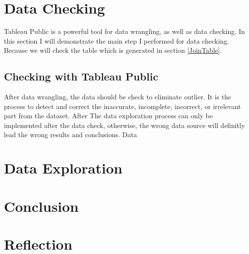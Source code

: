 \documentclass[11pt]{article}
\theoremstyle{definition}
\begin{document}
\section{Data Checking}
Tableau Public is a powerful tool for data wrangling, as well as data checking. In this section I will demonstrate the main step I performed for data checking. Because we will check the table which is generated in section \ref{JoinTable}. 
\label{dataChecking}
\subsection{Checking with Tableau Public}
After data wrangling, the data should be check to eliminate outlier. It is the process to detect and correct the inaccurate, incomplete, incorrect, or irrelevant part from the dataset. After 
The data exploration process can only be implemented after the data check, otherwise, the wrong data source will definitly lead the wrong results and conclusions. Data 

\section{Data Exploration}
\label{dataExploration}


\section{Conclusion}

\section{Reflection}
\end{document}
